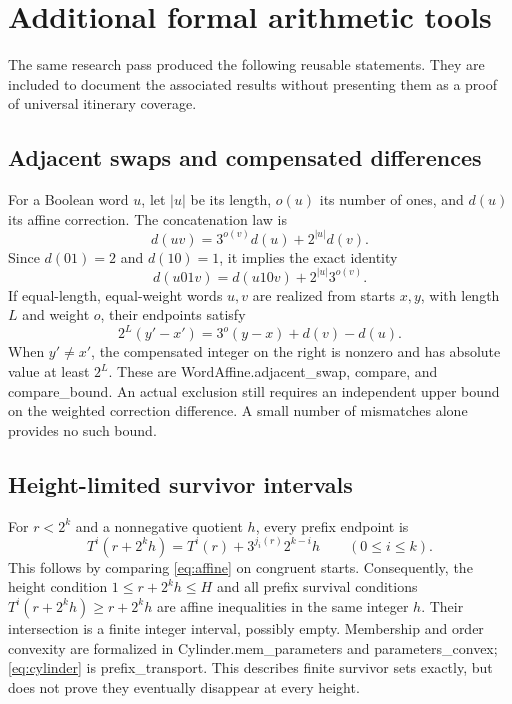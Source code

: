 \documentclass[11pt]{article}
\theoremstyle{remark}
\newcommand{\code}[1]{{\small\ttfamily #1}}
\begin{document}
\section{Additional formal arithmetic tools}\label{sec:tools}
The same research pass produced the following reusable statements. They
are included to document the associated results without presenting them
as a proof of universal itinerary coverage.

\subsection{Adjacent swaps and compensated differences}
For a Boolean word $u$, let $|u|$ be its length, $o(u)$ its number of ones,
and $d(u)$ its affine correction. The concatenation law is
\[
d(uv)=3^{o(v)}d(u)+2^{|u|}d(v).
\]
Since $d(01)=2$ and $d(10)=1$, it implies the exact identity
\begin{equation}\label{eq:swap}
d(u01v)=d(u10v)+2^{|u|}3^{o(v)}.
\end{equation}
If equal-length, equal-weight words $u,v$ are realized from starts $x,y$,
with length $L$ and weight $o$, their endpoints satisfy
\[
2^L(y'-x')=3^o(y-x)+d(v)-d(u).
\]
When $y'\ne x'$, the compensated integer on the right is nonzero and
has absolute value at least $2^L$. These are
\code{WordAffine.adjacent\_\allowbreak{}swap}, \code{compare}, and \code{compare\_\allowbreak{}bound}.
An actual exclusion still requires an independent upper bound on the
weighted correction difference. A small number of mismatches alone
provides no such bound.

\subsection{Height-limited survivor intervals}
For $r<2^k$ and a nonnegative quotient $h$, every prefix endpoint is
\begin{equation}\label{eq:cylinder}
T^i(r+2^kh)=T^i(r)+3^{j_i(r)}2^{k-i}h\qquad(0\le i\le k).
\end{equation}
This follows by comparing \eqref{eq:affine} on congruent starts.
Consequently, the height condition $1\le r+2^kh\le H$ and all prefix
survival conditions $T^i(r+2^kh)\ge r+2^kh$ are affine inequalities in
the same integer $h$. Their intersection is a finite integer interval,
possibly empty. Membership and order convexity are formalized in
\code{Cylinder.mem\_\allowbreak{}parameters} and \code{parameters\_\allowbreak{}convex};
\eqref{eq:cylinder} is \code{prefix\_\allowbreak{}transport}.
This describes finite survivor sets exactly, but does not prove they
eventually disappear at every height.
\end{document}
